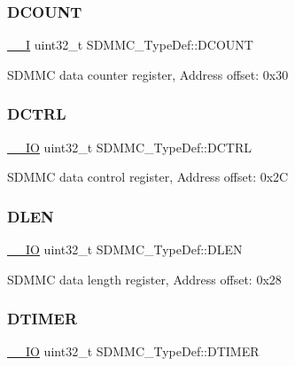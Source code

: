 \subsubsection{\texorpdfstring{DCOUNT}{DCOUNT}}
{\footnotesize\ttfamily \mbox{\hyperlink{core__sc300_8h_af63697ed9952cc71e1225efe205f6cd3}{\+\_\+\+\_\+I}} uint32\+\_\+t S\+D\+M\+M\+C\+\_\+\+Type\+Def\+::\+D\+C\+O\+U\+NT}

S\+D\+M\+MC data counter register, Address offset\+: 0x30 \mbox{\label{struct_s_d_m_m_c___type_def_aa179173b3d0e158365b13f9ccdad1665}} 
\subsubsection{\texorpdfstring{DCTRL}{DCTRL}}
{\footnotesize\ttfamily \mbox{\hyperlink{core__sc300_8h_aec43007d9998a0a0e01faede4133d6be}{\+\_\+\+\_\+\+IO}} uint32\+\_\+t S\+D\+M\+M\+C\+\_\+\+Type\+Def\+::\+D\+C\+T\+RL}

S\+D\+M\+MC data control register, Address offset\+: 0x2C \mbox{\label{struct_s_d_m_m_c___type_def_a4e2ca4e135c5074163d108bea39330fc}} 
\subsubsection{\texorpdfstring{DLEN}{DLEN}}
{\footnotesize\ttfamily \mbox{\hyperlink{core__sc300_8h_aec43007d9998a0a0e01faede4133d6be}{\+\_\+\+\_\+\+IO}} uint32\+\_\+t S\+D\+M\+M\+C\+\_\+\+Type\+Def\+::\+D\+L\+EN}

S\+D\+M\+MC data length register, Address offset\+: 0x28 \mbox{\label{struct_s_d_m_m_c___type_def_abce8a3725f3ea302da79e28f75ed8e5f}} 
\subsubsection{\texorpdfstring{DTIMER}{DTIMER}}
{\footnotesize\ttfamily \mbox{\hyperlink{core__sc300_8h_aec43007d9998a0a0e01faede4133d6be}{\+\_\+\+\_\+\+IO}} uint32\+\_\+t S\+D\+M\+M\+C\+\_\+\+Type\+Def\+::\+D\+T\+I\+M\+ER}

